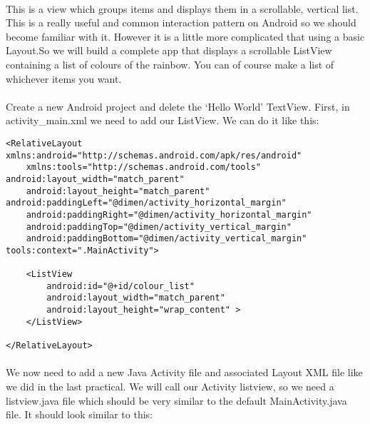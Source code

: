 \paragraph{} This is a view which groups items and displays them in a scrollable, vertical list. This is a really useful and common interaction pattern on Android so we should become familiar with it. However it is a little more complicated that using a basic Layout.So we will build a complete app that displays a scrollable ListView containing a list of colours of the rainbow. You can of course make a list of whichever items you want.

\paragraph{} Create a new Android project and delete the `Hello World' TextView. First, in activity\_main.xml we need to add our ListView. We can do it like this:

\begin{lstlisting}
<RelativeLayout xmlns:android="http://schemas.android.com/apk/res/android"
    xmlns:tools="http://schemas.android.com/tools" android:layout_width="match_parent"
    android:layout_height="match_parent" android:paddingLeft="@dimen/activity_horizontal_margin"
    android:paddingRight="@dimen/activity_horizontal_margin"
    android:paddingTop="@dimen/activity_vertical_margin"
    android:paddingBottom="@dimen/activity_vertical_margin" tools:context=".MainActivity">

    <ListView
        android:id="@+id/colour_list"
        android:layout_width="match_parent"
        android:layout_height="wrap_content" >
    </ListView>

</RelativeLayout>
\end{lstlisting}

\paragraph{} We now need to add a new Java Activity file and associated Layout XML file like we did in the last practical. We will call our Activity listview, so we need a listview.java file which should be very similar to the default MainActivity.java file. It should look similar to this:

